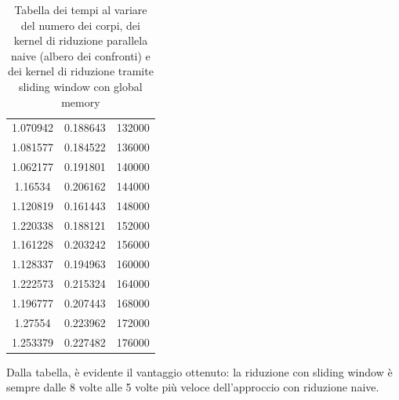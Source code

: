 \documentclass{article}
\begin{document}
\begin{table}[h]
\begin{tabular}{c|c|c}
			1.070942 & 0.188643 & 132000 \\
			1.081577 & 0.184522 & 136000 \\
			1.062177 & 0.191801 & 140000 \\
			1.16534 & 0.206162 & 144000 \\
			1.120819 & 0.161443 & 148000 \\
			1.220338 & 0.188121 & 152000 \\
			1.161228 & 0.203242 & 156000 \\
			1.128337 & 0.194963 & 160000 \\
			1.222573 & 0.215324 & 164000 \\
			1.196777 & 0.207443 & 168000 \\
			1.27554 & 0.223962 & 172000 \\
			1.253379 & 0.227482 & 176000 \\
		\end{tabular}
		\caption{Tabella dei tempi al variare del numero dei corpi, dei kernel di riduzione parallela naive (albero dei confronti) e dei kernel di riduzione tramite sliding window con global memory}
	\end{table}
	
	Dalla tabella, è evidente il vantaggio ottenuto: la riduzione con sliding window è sempre dalle 8 volte alle 5 volte più veloce dell'approccio con riduzione naive.
	\newpage
	
	\newpage
	\printbibliography
	
\end{document}
